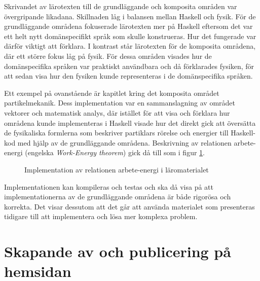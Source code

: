Skrivandet av lärotexten till de grundläggande och komposita områden var
övergripande likadana. Skillnaden låg i balansen mellan Haskell och fysik. För
de grundläggande områdena fokuserade lärotexten mer på Haskell eftersom det var
ett helt nytt domänspecifikt språk som skulle konstrueras. Hur det fungerade var
därför viktigt att förklara. I kontrast står lärotexten för de komposita
områdena, där ett större fokus låg på fysik. För dessa områden visades hur de
domänspecifika språken var praktiskt användbara och då förklarades fysiken, för
att sedan visa hur den fysiken kunde representeras i de domänspecifika
språken.

Ett exempel på ovanstående är kapitlet kring det komposita området partikelmekanik. Dess implementation var en sammanslagning av området vektorer och
matematisk analys, där istället för att visa och förklara hur områdena kunde
implementeras i Haskell visade hur det direkt gick att översätta de
fysikaliska formlerna som beskriver partiklars rörelse och energier till
Haskell-kod med hjälp av de grundläggande områdena. Beskrivning av relationen arbete-energi (engelska \textit{Work-Energy theorem}) gick då till som i figur \ref{fig:komposit-ex}.

\begin{figure}[tph]
  \centering
  \caption{Implementation av relationen arbete-energi i läromaterialet}
  \label{fig:komposit-ex}
\end{figure}

Implementationen kan kompileras och testas och ska då visa på att
implementationerna av de grundläggande områdena är både rigorösa och korrekta.
Det visar dessutom att det går att använda materialet som presenteras tidigare
till att implementera och lösa mer komplexa problem.

\section{Skapande av och publicering på hemsidan}

